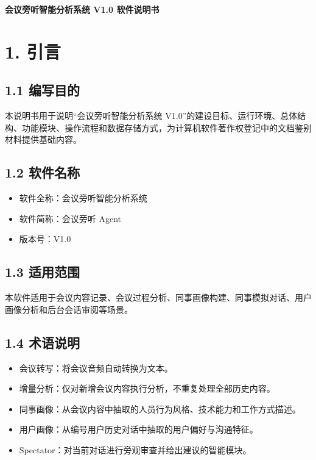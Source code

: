 \documentclass[12pt,a4paper]{article}
\begin{document}
\fancyhead[R]{}
\begin{center}\LARGE\bfseries 会议旁听智能分析系统 V1.0 软件说明书\par\end{center}
\vspace{0.45em}
\section*{1. 引言}
\vspace{0.45em}
\subsection*{1.1 编写目的}
\vspace{0.45em}
本说明书用于说明“会议旁听智能分析系统 V1.0”的建设目标、运行环境、总体结构、功能模块、操作流程和数据存储方式，为计算机软件著作权登记中的文档鉴别材料提供基础内容。\par
\vspace{0.45em}
\subsection*{1.2 软件名称}
\vspace{0.45em}
\begin{itemize}
\item 软件全称：会议旁听智能分析系统
\item 软件简称：会议旁听 Agent
\item 版本号：V1.0
\end{itemize}
\vspace{0.45em}
\subsection*{1.3 适用范围}
\vspace{0.45em}
本软件适用于会议内容记录、会议过程分析、同事画像构建、同事模拟对话、用户画像分析和后台会话审阅等场景。\par
\vspace{0.45em}
\subsection*{1.4 术语说明}
\vspace{0.45em}
\begin{itemize}
\item 会议转写：将会议音频自动转换为文本。
\item 增量分析：仅对新增会议内容执行分析，不重复处理全部历史内容。
\item 同事画像：从会议内容中抽取的人员行为风格、技术能力和工作方式描述。
\item 用户画像：从编号用户历史对话中抽取的用户偏好与沟通特征。
\item Spectator：对当前对话进行旁观审查并给出建议的智能模块。
\end{itemize}
\vspace{0.45em}
\end{document}
